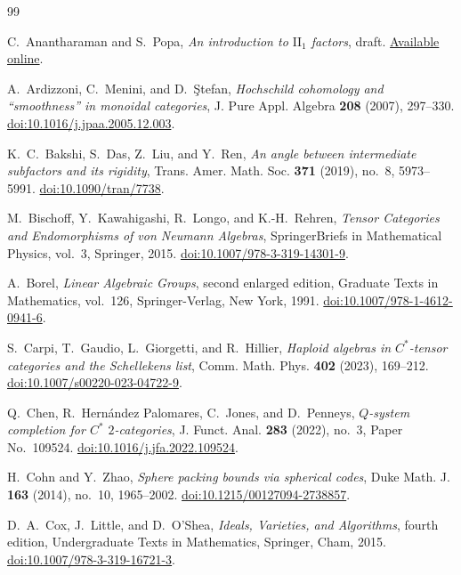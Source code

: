 \documentclass[11pt]{amsart}
\theoremstyle{definition}
\theoremstyle{remark}
\begin{document}
\begin{thebibliography}{99}
\raggedright

C.~Anantharaman and S.~Popa,
\emph{An introduction to $\mathrm{II}_1$ factors}, draft.
\href{https://www.math.ucla.edu/~popa/Books/IIun.pdf}{Available online}.

A.~Ardizzoni, C.~Menini, and D.~\c{S}tefan,
\emph{Hochschild cohomology and ``smoothness'' in monoidal categories},
J. Pure Appl. Algebra \textbf{208} (2007), 297--330.
\href{https://doi.org/10.1016/j.jpaa.2005.12.003}
{doi:10.1016/j.jpaa.2005.12.003}.

K.~C.~Bakshi, S.~Das, Z.~Liu, and Y.~Ren,
\emph{An angle between intermediate subfactors and its rigidity},
Trans. Amer. Math. Soc. \textbf{371} (2019), no.~8, 5973--5991.
\href{https://doi.org/10.1090/tran/7738}{doi:10.1090/tran/7738}.

M.~Bischoff, Y.~Kawahigashi, R.~Longo, and K.-H.~Rehren,
\emph{Tensor Categories and Endomorphisms of von Neumann Algebras},
SpringerBriefs in Mathematical Physics, vol.~3, Springer, 2015.
\href{https://doi.org/10.1007/978-3-319-14301-9}
{doi:10.1007/978-3-319-14301-9}.

A.~Borel,
\emph{Linear Algebraic Groups},
second enlarged edition, Graduate Texts in Mathematics, vol.~126,
Springer-Verlag, New York, 1991.
\href{https://doi.org/10.1007/978-1-4612-0941-6}
{doi:10.1007/978-1-4612-0941-6}.

S.~Carpi, T.~Gaudio, L.~Giorgetti, and R.~Hillier,
\emph{Haploid algebras in $C^*$-tensor categories and the Schellekens list},
Comm. Math. Phys. \textbf{402} (2023), 169--212.
\href{https://doi.org/10.1007/s00220-023-04722-9}
{doi:10.1007/s00220-023-04722-9}.

Q.~Chen, R.~Hern\'andez Palomares, C.~Jones, and D.~Penneys,
\emph{$Q$-system completion for $C^*$ $2$-categories},
J. Funct. Anal. \textbf{283} (2022), no.~3, Paper No.~109524.
\href{https://doi.org/10.1016/j.jfa.2022.109524}
{doi:10.1016/j.jfa.2022.109524}.

H.~Cohn and Y.~Zhao,
\emph{Sphere packing bounds via spherical codes},
Duke Math. J. \textbf{163} (2014), no.~10, 1965--2002.
\href{https://doi.org/10.1215/00127094-2738857}
{doi:10.1215/00127094-2738857}.

D.~A.~Cox, J.~Little, and D.~O'Shea,
\emph{Ideals, Varieties, and Algorithms}, fourth edition,
Undergraduate Texts in Mathematics, Springer, Cham, 2015.
\href{https://doi.org/10.1007/978-3-319-16721-3}
{doi:10.1007/978-3-319-16721-3}.


\end{thebibliography}
\end{document}
